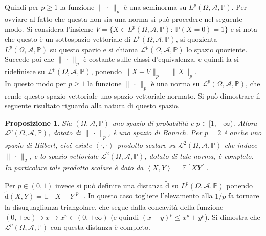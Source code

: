 \documentclass[11pt]{book}
\theoremstyle{Definizione}
\theoremstyle{TeoremaProposizioneLemmaCorollario}
\newtheorem{mypropo}[myteo]{Proposizione}
\theoremstyle{OsservazioneNota}
\newcommand{\prsc}[3][]{\left\langle {#2},{#3}\right\rangle_{#1}}
\renewcommand{\P}{\mathbb{P}}
\renewcommand{\d}{\mathrm{d}}
\newcommand{\E}{\mathbb{E}}
\begin{document}
Quindi per $p\geq 1$ la funzione $\|\,\cdot\,\|_p$ è una seminorma su $L^p(\Omega,\mathcal{A},\P)$. Per ovviare al fatto che questa non sia una norma si può procedere nel seguente modo. Si considera l'insieme $V=\{X\in L^p(\Omega,\mathcal{A},\P):\ \P(X = 0) = 1\}$ e si nota che questo è un sottospazio vettoriale di $L^p(\Omega,\mathcal{A},\P)$, si quozienta $L^p(\Omega,\mathcal{A},\P)$ su questo spazio e si chiama $\mathscr{L}^p(\Omega,\mathcal{A},\P)$ lo spazio quoziente. Succede poi che $\|\,\cdot\,\|_p$ è costante sulle classi d'equivalenza, e quindi la si ridefinisce su $\mathscr{L}^p(\Omega,\mathcal{A},\P)$, ponendo $\|X +V\|_p = \|X\|_p$.\\
In questo modo per $p\geq 1$ la funzione $\|\,\cdot\,\|_p$ è una norma su $\mathscr{L}^p(\Omega,\mathcal{A},\P)$, che rende questo spazio vettoriale uno spazio vettoriale normato. Si può dimostrare il seguente risultato riguardo alla natura di questo spazio.
\begin{boxpro}
\begin{mypropo}
Sia $(\Omega,\mathcal{A},\P)$ uno spazio di probabilità e $p\in [1,+\infty)$. Allora $\mathscr{L}^p(\Omega,\mathcal{A},\P)$, dotato di $\|\,\cdot\,\|_p$, è uno spazio di Banach. Per $p = 2$ è anche uno spazio di Hilbert, cioè esiste $\prsc{\cdot}{\cdot}$ prodotto scalare su $\mathscr{L}^2(\Omega,\mathcal{A},\P)$ che induce $\|\,\cdot\,\|_2$, e lo spazio vettoriale $\mathscr{L}^2(\Omega,\mathcal{A},\P)$, dotato di tale norma, è completo. In particolare tale prodotto scalare è dato da $\prsc{X}{Y} = \E[XY]$.
\end{mypropo}
\end{boxpro}
\noindent
Per $p \in (0,1)$ invece si può definire una distanza $\widetilde{\d}$ su $L^p(\Omega,\mathcal{A},\P)$ ponendo $\widetilde{\d}(X,Y) = \E[|X-Y|^p]$. In questo caso togliere l'elevamento alla $1/p$ fa tornare la disuguaglianza triangolare, che segue dalla concavità della funzione $(0,+\infty)\ni x \longmapsto x^p\in (0,+\infty)$ (e quindi $(x+y)^p \leq x^p+y^p$). Si dimostra che $\mathscr{L}^p(\Omega,\mathcal{A},\P)$ con questa distanza è completo.
\end{document}
